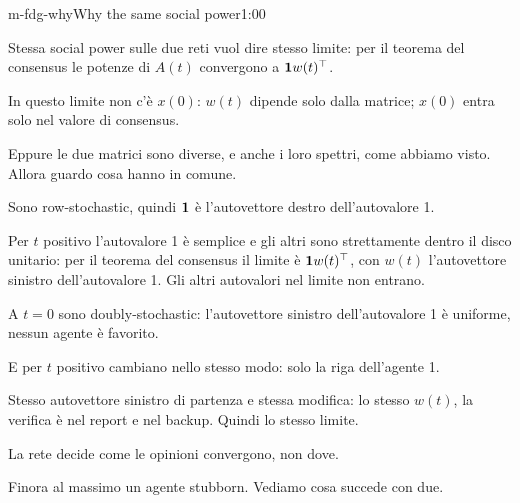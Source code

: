 \begin{slide}{m-fdg-why}{Why the same social power}{1:00}
  \begin{discorso}
    \item Stessa social power sulle due reti vuol dire stesso limite: per il teorema del consensus le potenze di $A(t)$ convergono a $\mathbf{1} w(t)^\top$.
    \item In questo limite non c'è $x(0)$: $w(t)$ dipende solo dalla matrice; $x(0)$ entra solo nel valore di consensus.
    \item Eppure le due matrici sono diverse, e anche i loro spettri, come abbiamo visto. Allora guardo cosa hanno in comune.
    \item Sono row-stochastic, quindi $\mathbf{1}$ è l'autovettore destro dell'autovalore 1.
    \item Per $t$ positivo l'autovalore 1 è semplice e gli altri sono strettamente dentro il disco unitario: per il teorema del consensus il limite è $\mathbf{1} w(t)^\top$, con $w(t)$ l'autovettore sinistro dell'autovalore 1. Gli altri autovalori nel limite non entrano.
    \item A $t=0$ sono doubly-stochastic: l'autovettore sinistro dell'autovalore 1 è uniforme, nessun agente è favorito.
    \item E per $t$ positivo cambiano nello stesso modo: solo la riga dell'agente 1.
    \item Stesso autovettore sinistro di partenza e stessa modifica: lo stesso $w(t)$, la verifica è nel report e nel backup. Quindi lo stesso limite.
    \item La rete decide come le opinioni convergono, non dove.
    \item Finora al massimo un agente stubborn. Vediamo cosa succede con due.
  \end{discorso}
\end{slide}

